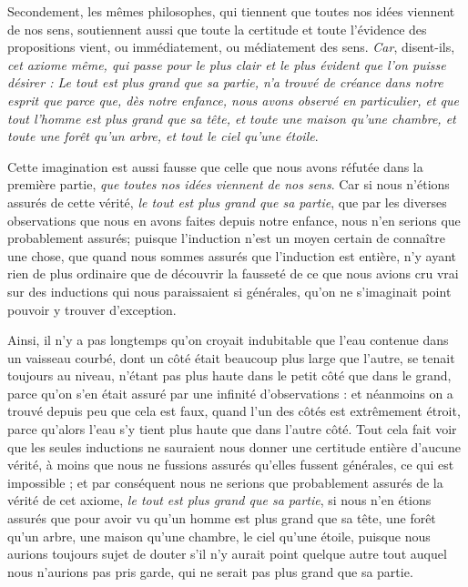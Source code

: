 Secondement, les mêmes philosophes, qui tiennent que toutes nos idées viennent de nos sens, soutiennent aussi que toute la certitude et toute l'évidence des propositions vient, ou immédiatement, ou médiatement des sens. \emph{Car}, disent-ils, \emph{cet axiome même, qui passe pour le plus clair et le plus évident que l'on puisse désirer : Le tout est plus grand que sa partie, n'a trouvé de créance dans notre esprit que parce que, dès notre enfance, nous avons observé en particulier, et que tout l'homme est plus grand que sa tête, et toute une maison qu'une chambre, et toute une forêt qu'un arbre, et tout le ciel qu'une étoile}.

Cette imagination est aussi fausse que celle que nous avons réfutée dans la première partie, \emph{que toutes nos idées viennent de nos sens}. Car si nous n'étions assurés de cette vérité, \emph{le tout est plus grand que sa partie}, que par les diverses observations que nous en avons faites depuis notre enfance, nous n'en serions que probablement assurés; puisque l'induction n'est un moyen certain de connaître une chose, que quand nous sommes assurés que l'induction est entière, n'y ayant rien de plus ordinaire que de découvrir la fausseté de ce que nous avions cru vrai sur des inductions qui nous paraissaient si générales, qu'on ne s'imaginait point pouvoir y trouver d'exception.

Ainsi, il n'y a pas longtemps qu'on croyait indubitable que l'eau contenue dans un vaisseau courbé, dont un côté était beaucoup plus large que l'autre, se tenait toujours au niveau, n'étant pas plus haute dans le petit côté que dans le grand, parce qu'on s'en était assuré par une infinité d'observations : et néanmoins on a trouvé depuis peu que cela est faux, quand l'un des côtés est extrêmement étroit, parce qu'alors l'eau s'y tient plus haute que dans l'autre côté. Tout cela fait voir que les seules inductions ne sauraient nous donner une certitude entière d'aucune vérité, à moins que nous ne fussions assurés qu'elles fussent générales, ce qui est impossible ; et par conséquent nous ne serions que probablement assurés de la vérité de cet axiome, \emph{le tout est plus grand que sa partie}, si nous n'en étions assurés que pour avoir vu qu'un homme est plus grand que sa tête, une forêt qu'un arbre, une maison qu'une chambre, le ciel qu'une étoile, puisque nous aurions toujours sujet de douter s'il n'y aurait point quelque autre tout auquel nous n'aurions pas pris garde, qui ne serait pas plus grand que sa partie.

